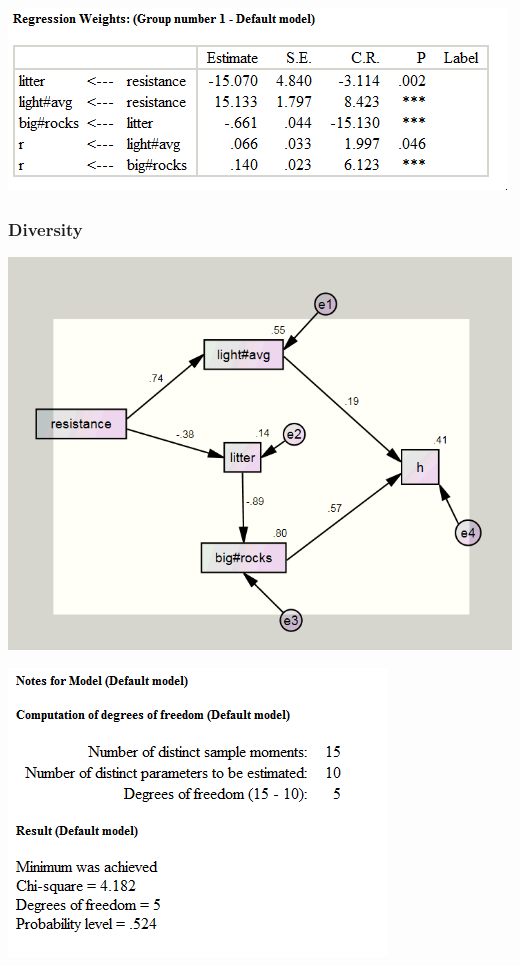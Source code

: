 \documentclass[a4paper]{article}
\begin{document}
\includegraphics[]{R_SEMreg.png}


\subsubsection{Diversity}

\includegraphics[]{H_SEMpathdia.png}

\includegraphics[]{H_SEMnotes.png}
\end{document}
